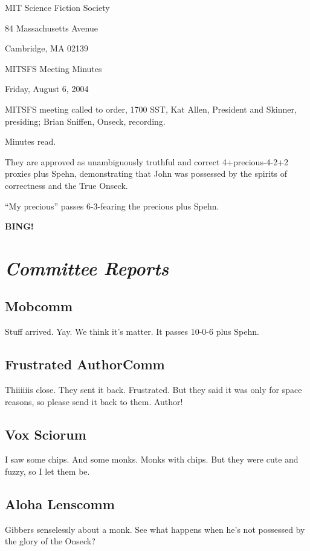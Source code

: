 \documentclass[10pt]{article}
\newcommand{\bing}{{\bf BING!} }
\newcommand{\goto}[1]{\bing \vskip 12pt \section*{{\em{#1}}}}
\newcommand{\ps}{ plus Spehn\xspace}
\begin{document}
\begin{center}

MIT Science Fiction Society 

84 Massachusetts Avenue

Cambridge, MA 02139

\vspace{12pt}

MITSFS Meeting Minutes 

Friday, August 6, 2004

\end{center}
 
\vspace{18pt}

\setlength{\parskip}{6pt}

\noindent
MITSFS meeting called to order, 1700 SST, Kat Allen, President and
Skinner, presiding; Brian Sniffen,  Onseck, recording.

Minutes read.

They are approved as unambiguously truthful and correct
4+precious-4-2+2 proxies\ps, demonstrating that John was possessed by
the spirits of correctness and the True Onseck.

``My precious'' passes 6-3-fearing the precious\ps.

\goto{Committee Reports}
\subsection*{Mobcomm}
Stuff arrived.  Yay.  We think it's matter.  It passes 10-0-6\ps.

\subsection*{Frustrated AuthorComm}
Thiiiiiis close.  They sent it back.  Frustrated.  But they said it
was only for space reasons, so please send it back to them.  Author!

\subsection*{Vox Sciorum}
I saw some chips.  And some monks.  Monks with chips.  But they were
cute and fuzzy, so I let them be.

\subsection*{Aloha Lenscomm}
Gibbers senselessly about a monk.  See what happens when he's not
possessed by the glory of the Onseck?
\end{document}
